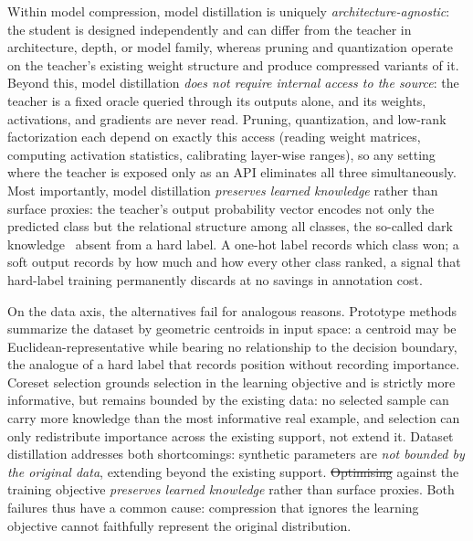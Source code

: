 \documentclass[12pt, a4paper, twoside]{book}
\makeatletter
\numberwithin{equation}{chapter}
\theoremstyle{plain}
\theoremstyle{definition}
\theoremstyle{remark}
\newenvironment{foldable}{}{}
\providecommand{\DIFaddtex}[1]{{\protect\color{blue}\uwave{#1}}} %
\providecommand{\DIFdeltex}[1]{{\protect\color{red}\sout{#1}}} %
\providecommand{\DIFaddbegin}{} %
\providecommand{\DIFaddend}{} %
\providecommand{\DIFdelbegin}{} %
\providecommand{\DIFdelend}{} %
\providecommand{\DIFadd}[1]{\texorpdfstring{\DIFaddtex{#1}}{#1}} %
\providecommand{\DIFdel}[1]{\texorpdfstring{\DIFdeltex{#1}}{}} %
\newcommand{\DIFscaledelfig}{0.5}
\newlength{\DIFdelgraphicswidth} %
\newlength{\DIFdelgraphicsheight} %
\newcommand{\DIFaddincludegraphics}[2][]{{\color{blue}\fbox{\DIFOincludegraphics[#1]{#2}}}} %
\newcommand{\DIFdelincludegraphics}[2][]{%
\sbox{\DIFdelgraphicsbox}{\DIFOincludegraphics[#1]{#2}}%
\settoboxwidth{\DIFdelgraphicswidth}{\DIFdelgraphicsbox} %
\settoboxtotalheight{\DIFdelgraphicsheight}{\DIFdelgraphicsbox} %
\scalebox{\DIFscaledelfig}{%
\parbox[b]{\DIFdelgraphicswidth}{\usebox{\DIFdelgraphicsbox}\\[-\baselineskip] \rule{\DIFdelgraphicswidth}{0em}}\llap{\resizebox{\DIFdelgraphicswidth}{\DIFdelgraphicsheight}{%
\setlength{\unitlength}{\DIFdelgraphicswidth}%
\begin{picture}(1,1)%
\thicklines\linethickness{2pt} %
{\color[rgb]{1,0,0}\put(0,0){\framebox(1,1){}}}%
{\color[rgb]{1,0,0}\put(0,0){\line( 1,1){1}}}%
{\color[rgb]{1,0,0}\put(0,1){\line(1,-1){1}}}%
\end{picture}%
}\hspace*{3pt}}} %
} %
\DeclareRobustCommand{\DIFaddbegin}{\DIFOaddbegin \let\includegraphics\DIFaddincludegraphics} %
\DeclareRobustCommand{\DIFaddend}{\DIFOaddend \let\includegraphics\DIFOincludegraphics} %
\DeclareRobustCommand{\DIFdelbegin}{\DIFOdelbegin \let\includegraphics\DIFdelincludegraphics} %
\DeclareRobustCommand{\DIFdelend}{\DIFOaddend \let\includegraphics\DIFOincludegraphics} %
\let\sout@orig\sout %
\renewcommand{\sout}[1]{\ifmmode\text{\sout@orig{\ensuremath{#1}}}\else\sout@orig{#1}\fi} %
\makeatother
\begin{document}
\begin{foldable}
  Within model compression, model distillation is uniquely \textit{architecture-agnostic}: the student is designed independently and can differ from the teacher in architecture, depth, or model family, whereas pruning and quantization operate on the teacher's existing weight structure and produce compressed variants of it.
  Beyond this, model distillation \textit{does not require internal access to the source}: the teacher is a fixed oracle queried through its outputs alone, and its weights, activations, and gradients are never read.
  Pruning, quantization, and low-rank factorization each depend on exactly this access (reading weight matrices, computing activation statistics, calibrating layer-wise ranges), so any setting where the teacher is exposed only as an \ac{API} eliminates all three simultaneously.
  Most importantly, model distillation \textit{preserves learned knowledge} rather than surface proxies: the teacher's output probability vector encodes not only the predicted class but the relational structure among all classes, the so-called dark knowledge~\cite{hinton2015distilling} absent from a hard label.
  A one-hot label records which class won; a soft output records by how much and how every other class ranked, a signal that hard-label training permanently discards at no savings in annotation cost.
\end{foldable}

\begin{foldable}
  On the data axis, the alternatives fail for analogous reasons.
  Prototype methods summarize the dataset by geometric centroids in input space: a centroid may be Euclidean-representative while bearing no relationship to the decision boundary, the analogue of a hard label that records position without recording importance.
  Coreset selection grounds selection in the learning objective and is strictly more informative, but remains bounded by the existing data: no selected sample can carry more knowledge than the most informative real example, and selection can only redistribute importance across the existing support, not extend it.
  Dataset distillation addresses both shortcomings: synthetic parameters are \textit{not bounded by the original data}, extending beyond the existing support.
  \DIFdelbegin \DIFdel{Optimising }\DIFdelend \DIFaddbegin \DIFadd{Optimizing }\DIFaddend against the training objective \textit{preserves learned knowledge} rather than surface proxies.
  Both failures thus have a common cause: compression that ignores the learning objective cannot faithfully represent the original distribution.
\end{foldable}
\end{document}
